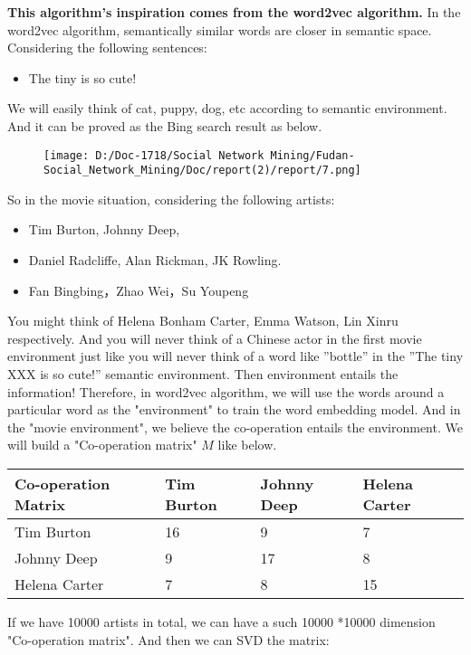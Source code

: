 \documentclass[]{article}
\begin{document}
\textbf{This algorithm's inspiration comes from the word2vec algorithm.}
In the word2vec algorithm, semantically similar words are closer in
semantic space. Considering the following sentences:

\begin{itemize}
\item
  The tiny \textbf{} is so cute!
\end{itemize}

We will easily think of cat, puppy, dog, etc according to semantic
environment. And it can be proved as the Bing search result as below.

\begin{figure}
\centering
\texttt{[image: D:/Doc-1718/Social Network Mining/Fudan-Social\_Network\_Mining/Doc/report(2)/report/7.png]}
\caption{}
\end{figure}

So in the movie situation, considering the following artists:

\begin{itemize}
\item
  Tim Burton, Johnny Deep,
\item
  Daniel Radcliffe, Alan Rickman, JK Rowling.
\item
  Fan Bingbing，Zhao Wei，Su Youpeng
\end{itemize}

You might think of Helena Bonham Carter, Emma Watson, Lin Xinru
respectively. And you will never think of a Chinese actor in the first
movie environment just like you will never think of a word like
''bottle'' in the ''The tiny XXX is so cute!'' semantic environment.
Then environment entails the information! Therefore, in word2vec
algorithm, we will use the words around a particular word as the
"environment" to train the word embedding model. And in the "movie
environment", we believe the co-operation entails the environment. We
will build a "Co-operation matrix" \(M\) like below.

\begin{longtable}[]{@{}llll@{}}
\toprule
Co-operation Matrix & Tim Burton & Johnny Deep & Helena
Carter\tabularnewline
\midrule
\endhead
Tim Burton & 16 & 9 & 7\tabularnewline
Johnny Deep & 9 & 17 & 8\tabularnewline
Helena Carter & 7 & 8 & 15\tabularnewline
\bottomrule
\end{longtable}

If we have 10000 artists in total, we can have a such 10000 *10000
dimension "Co-operation matrix". And then we can SVD the matrix:
\end{document}
